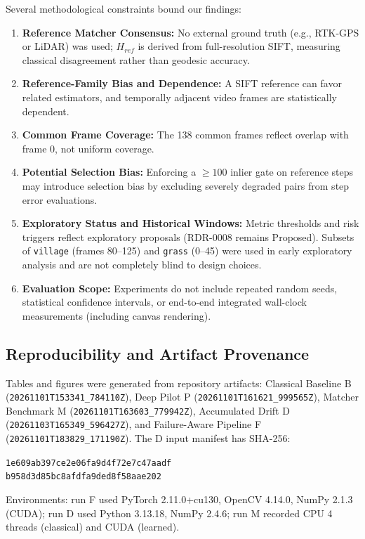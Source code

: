 \documentclass[conference]{IEEEtran}
\begin{document}
Several methodological constraints bound our findings:
\begin{enumerate}\setlength{\itemsep}{1.5pt}\setlength{\parskip}{0pt}
    \item \textbf{Reference Matcher Consensus:} No external ground truth (e.g., RTK-GPS or LiDAR) was used; $H_{ref}$ is derived from full-resolution SIFT, measuring classical disagreement rather than geodesic accuracy.
    \item \textbf{Reference-Family Bias and Dependence:} A SIFT reference can favor related estimators, and temporally adjacent video frames are statistically dependent.
    \item \textbf{Common Frame Coverage:} The 138 common frames reflect overlap with frame 0, not uniform coverage.
    \item \textbf{Potential Selection Bias:} Enforcing a $\ge 100$ inlier gate on reference steps may introduce selection bias by excluding severely degraded pairs from step error evaluations.
    \item \textbf{Exploratory Status and Historical Windows:} Metric thresholds and risk triggers reflect exploratory proposals (RDR-0008 remains Proposed). Subsets of \texttt{village} (frames 80--125) and \texttt{grass} (0--45) were used in early exploratory analysis and are not completely blind to design choices.
    \item \textbf{Evaluation Scope:} Experiments do not include repeated random seeds, statistical confidence intervals, or end-to-end integrated wall-clock measurements (including canvas rendering).
\end{enumerate}

\subsection{Reproducibility and Artifact Provenance}
\label{subsec:reproducibility}

Tables and figures were generated from repository artifacts: Classical Baseline B (\nolinkurl{20261101T153341_784110Z}), Deep Pilot P (\nolinkurl{20261101T161621_999565Z}), Matcher Benchmark M (\nolinkurl{20261101T163603_779942Z}), Accumulated Drift D (\nolinkurl{20261103T165349_596427Z}), and Failure-Aware Pipeline F (\nolinkurl{20261101T183829_171190Z}). The D input manifest has SHA-256:
\begin{center}
\footnotesize
\texttt{1e609ab397ce2e06fa9d4f72e7c47aadf}\\
\texttt{b958d3d85bc8afdfa9ded8f58aae202}
\end{center}
Environments: run F used PyTorch 2.11.0+cu130, OpenCV 4.14.0, NumPy 2.1.3 (CUDA); run D used Python 3.13.18, NumPy 2.4.6; run M recorded CPU 4 threads (classical) and CUDA (learned).
\end{document}
